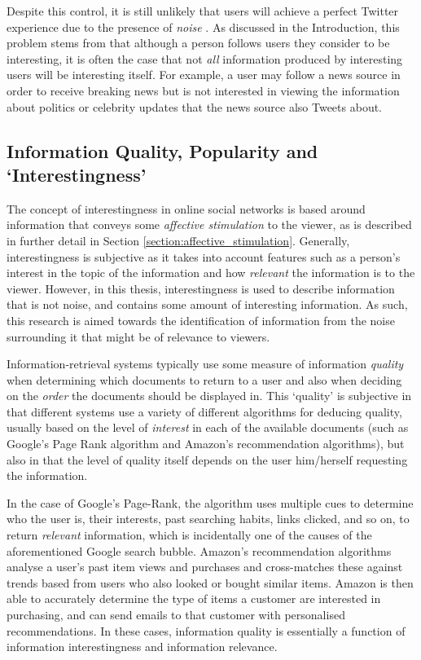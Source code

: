 Despite this control, it is still unlikely that users will achieve a perfect Twitter experience due to the presence of \textit{noise} \cite{alonso10}. As discussed in the Introduction, this problem stems from that although a person follows users they consider to be interesting, it is often the case that not \textit{all} information produced by interesting users will be interesting itself. For example, a user may follow a news source in order to receive breaking news but is not interested in viewing the information about politics or celebrity updates that the news source also Tweets about.


\subsection{Information Quality, Popularity and `Interestingness'}
The concept of interestingness in online social networks is based around information that conveys some \textit{affective stimulation} to the viewer, as is described in further detail in Section \ref{section:affective_stimulation}. Generally, interestingness is subjective as it takes into account features such as a person's interest in the topic of the information and how \textit{relevant} the information is to the viewer. However, in this thesis, interestingness is used to describe information that is not noise, and contains some amount of interesting information. As such, this research is aimed towards the identification of information from the noise surrounding it that might be of relevance to viewers.

Information-retrieval systems typically use some measure of information \textit{quality} when determining which documents to return to a user and also when deciding on the \textit{order} the documents should be displayed in. This `quality' is subjective in that different systems use a variety of different algorithms for deducing quality, usually based on the level of \textit{interest} in each of the available documents (such as Google's Page Rank algorithm and Amazon's recommendation algorithms), but also in that the level of quality itself depends on the user him/herself requesting the information. 

In the case of Google's Page-Rank, the algorithm uses multiple cues to determine who the user is, their interests, past searching habits, links clicked, and so on, to return \textit{relevant} information, which is incidentally one of the causes of the aforementioned Google search bubble. Amazon's recommendation algorithms analyse a user's past item views and purchases and cross-matches these against trends based from users who also looked or bought similar items. Amazon is then able to accurately determine the type of items a customer are interested in purchasing, and can send emails to that customer with personalised recommendations. In these cases, information quality is essentially a function of information interestingness and information relevance.

